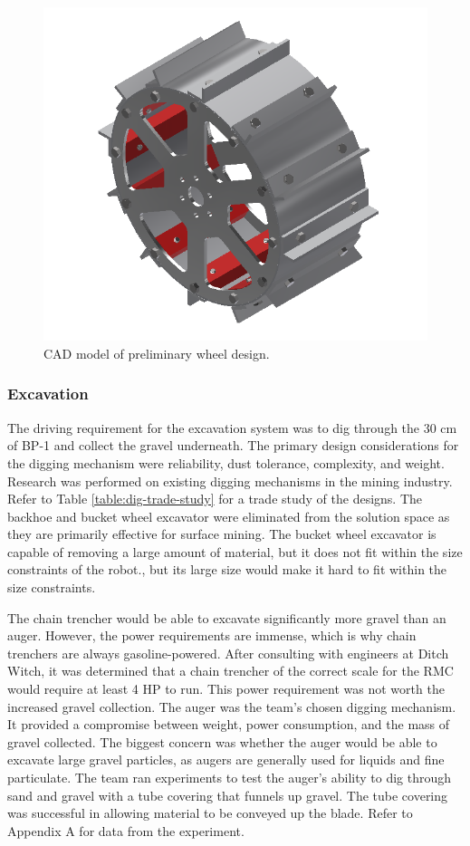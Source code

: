 \documentclass[class=article, crop=false]{standalone}
\begin{document}
	\FloatBarrier
		\begin{figure}[h]
			\centering
			\includegraphics[width=0.4\linewidth]{09_Figures/wheel-cad-preliminary.jpg}
			\caption{CAD model of preliminary wheel design.}
			\label{fig:cad-wheel-prelim}
		\end{figure}
		\FloatBarrier

	\subsubsection{Excavation}
	The driving requirement for the excavation system was to dig through the 30 cm of BP-1 and collect the gravel underneath. The primary design considerations for the digging mechanism were reliability, dust tolerance, complexity, and weight. 
Research was performed on existing digging mechanisms in the mining industry. Refer to Table \ref{table:dig-trade-study} for a trade study of the designs. The backhoe and bucket wheel excavator were eliminated from the solution space as they are primarily effective for surface mining.  The bucket wheel excavator is capable of removing a large amount of material, but it does not fit within the size constraints of the robot., but its large size would make it hard to fit within the size constraints. 

The chain trencher would be able to excavate significantly more gravel than an auger. However, the power requirements are immense, which is why chain trenchers are always gasoline-powered. After consulting with engineers at Ditch Witch, it was determined that a chain trencher of the correct scale for the RMC would require at least 4 HP to run. This power requirement was not worth the increased gravel collection. 
The auger was the team’s chosen digging mechanism. It provided a compromise between weight, power consumption, and the mass of gravel collected. The biggest concern was whether the auger would be able to excavate large gravel particles, as augers are generally used for liquids and fine particulate. The team ran experiments to test the auger’s ability to dig through sand and gravel with a tube covering that funnels up gravel. The tube covering was successful in allowing material to be conveyed up the blade. Refer to Appendix A for data from the experiment.
\end{document}

